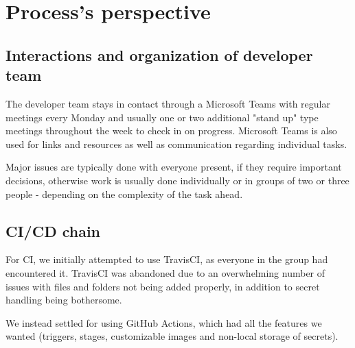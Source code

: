 \section{Process's perspective} \label{section:Process perspective}

\subsection{Interactions and organization of developer team} 
The developer team stays in contact through a Microsoft Teams with regular meetings every Monday and usually one or two additional "stand up" type meetings throughout the week to check in on progress. Microsoft Teams is also used for links and resources as well as communication regarding individual tasks.

Major issues are typically done with everyone present, if they require important decisions, otherwise work is usually done individually or in groups of two or three people - depending on the complexity of the task ahead.

\subsection{CI/CD chain} 
For CI, we initially attempted to use TravisCI, as everyone in the group had encountered it. TravisCI was abandoned due to an overwhelming number of issues with files and folders not being added properly, in addition to secret handling being bothersome.

We instead settled for using GitHub Actions, which had all the features we wanted (triggers, stages, customizable images and non-local storage of secrets).

